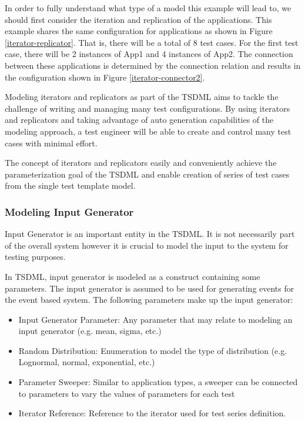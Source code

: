 In order to fully understand what type of a model this example will lead to, we should first consider the iteration and replication of the applications. This example shares the same configuration for applications as shown in Figure \ref{iterator-replicator}. That is, there will be a total of 8 test cases. For the first test case, there will be 2 instances of App1 and 4 instances of App2. The connection between these applications is determined by the connection relation and results in the configuration shown in Figure \ref{iterator-connector2}. 

Modeling iterators and replicators as part of the TSDML aims to tackle the challenge of writing and managing many test configurations. By using iterators and replicators and taking advantage of auto generation capabilities of the modeling approach, a test engineer will be able to create and control many test cases with minimal effort. 

The concept of iterators and replicators easily and conveniently achieve the parameterization goal of the TSDML and enable creation of series of test cases from the single test template model. 

\subsubsection{Modeling Input Generator}
Input Generator is an important entity in the TSDML. It is not necessarily part of the overall system however it is crucial to model the input to the system for testing purposes.

In TSDML, input generator is modeled as a construct containing some parameters. The input generator is assumed to be used for generating events for the event based system. The following parameters make up the input generator:

\begin{itemize}
	\item Input Generator Parameter: Any parameter that may relate to modeling an input generator (e.g. mean, sigma, etc.)
	\item Random Distribution: Enumeration to model the type of distribution (e.g. Lognormal, normal, exponential, etc.)
	\item Parameter Sweeper: Similar to application types, a sweeper can be connected to parameters to vary the values of parameters for each test
	\item Iterator Reference: Reference to the iterator used for test series definition. 
\end{itemize}

